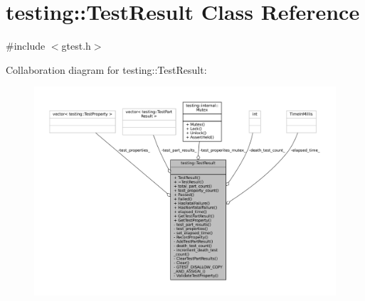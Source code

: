 \hypertarget{classtesting_1_1TestResult}{}\section{testing\+:\+:Test\+Result Class Reference}
\label{classtesting_1_1TestResult}


{\ttfamily \#include $<$gtest.\+h$>$}



Collaboration diagram for testing\+:\+:Test\+Result\+:
\nopagebreak
\begin{figure}[H]
\begin{center}
\leavevmode
\includegraphics[width=350pt]{classtesting_1_1TestResult__coll__graph}
\end{center}
\end{figure}
